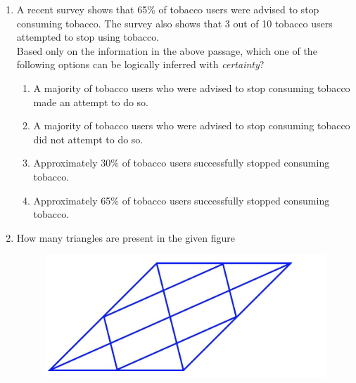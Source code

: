 \documentclass[12pt]{article}
\theoremstyle{remark}
\begin{document}
\begin{enumerate}
\begin{enumerate}
 \end{enumerate}
\hfill{}
\item A recent survey shows that 65\% of tobacco users were advised to stop consuming tobacco. The survey also shows that 3 out of 10 tobacco users attempted to stop using tobacco.\\
Based only on the information in the above passage, which one of the following options can be logically inferred with \textit{certainty}?\\ 
\begin{enumerate}
\item A majority of tobacco users who were advised to stop consuming tobacco made an attempt to do so.
\item A majority of tobacco users who were advised to stop consuming tobacco did not attempt to do so. 
\item Approximately 30\% of tobacco users successfully stopped consuming tobacco. 
\item Approximately 65\% of tobacco users successfully stopped consuming tobacco.
\end{enumerate}
\hfill{}
\item How many triangles are present in the given figure\\
\begin{figure} 
\includegraphics{Figs/Q5.png}\\
\caption{}
\label{Fig:1.1} 
\end{figure}
\begin{enumerate} 
\end{enumerate}
\end{enumerate}
\end{document}
